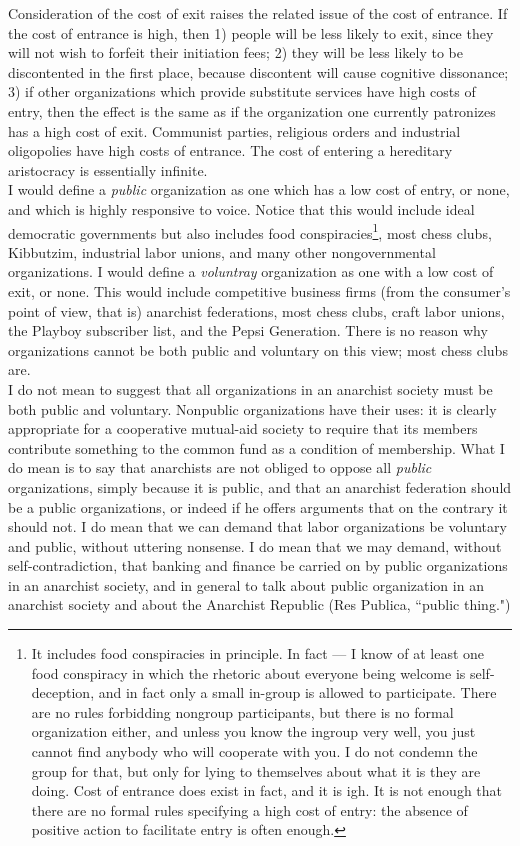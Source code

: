 \documentclass[12pt, onecolumn, letterpaper, oneside]{book}
\begin{document}
Consideration of the cost of exit raises the related issue of the cost of entrance. If the cost of entrance is high, then 1) people will be less likely to exit, since they will not wish to forfeit their initiation fees; 2) they will be less likely to be discontented in the first place, because discontent will cause cognitive dissonance; 3) if other organizations which provide substitute services have high costs of entry, then the effect is the same as if the organization one currently patronizes has a high cost of exit. Communist parties, religious orders and industrial oligopolies have high costs of entrance. The cost of entering a hereditary aristocracy is essentially infinite.\\
I would define a \emph{public} organization as one which has a low cost of entry, or none, and which is highly responsive to voice. Notice that this would include ideal democratic governments but also includes food conspiracies\footnote{It includes food conspiracies in principle. In fact --- I know of at least one food conspiracy in which the rhetoric about everyone being welcome is self-deception, and in fact only a small in-group is allowed to participate. There are no rules forbidding nongroup participants, but there is no formal organization either, and unless you know the ingroup very well, you just cannot find anybody who will cooperate with you. I do not condemn the group for that, but only for lying to themselves about what it is they are doing. Cost of entrance does exist in fact, and it is igh. It is not enough that there are no formal rules specifying a high cost of entry: the absence of positive action to facilitate entry is often enough.}, most chess clubs, Kibbutzim, industrial labor unions, and many other nongovernmental organizations. I would define a \emph{voluntray} organization as one with a low cost of exit, or none. This would include competitive business firms (from the consumer's point of view, that is) anarchist federations, most chess clubs, craft labor unions, the Playboy subscriber list, and the Pepsi Generation. There is no reason why organizations cannot be both public and voluntary on this view; most chess clubs are.\\
I do not mean to suggest that all organizations in an anarchist society must be both public and voluntary. Nonpublic organizations have their uses: it is clearly appropriate for a cooperative mutual-aid society to require that its members contribute something to the common fund as a condition of membership. What I do mean is to say that anarchists are not obliged to oppose all \emph{public} organizations, simply because it is public, and that an anarchist federation should be a public organizations, or indeed if he offers arguments that on the contrary it should not. I do mean that we can demand that labor organizations be voluntary and public, without uttering nonsense. I do mean that we may demand, without self-contradiction, that banking and finance be carried on by public organizations in an anarchist society, and in general to talk about public organization in an anarchist society and about the Anarchist Republic (Res Publica, ``public thing.")\\
\end{document}
